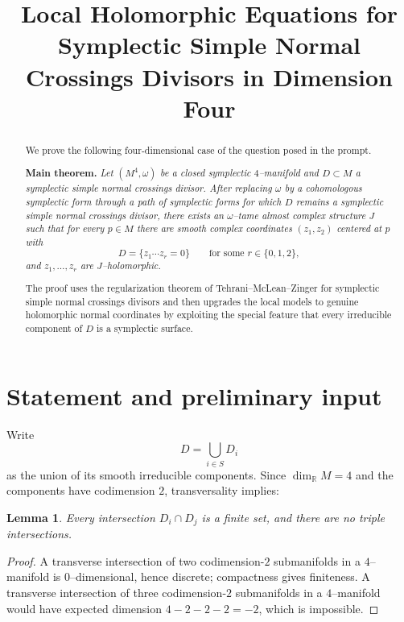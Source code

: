 \documentclass[11pt]{article}
\title{Local Holomorphic Equations for Symplectic Simple Normal Crossings Divisors in Dimension Four}
\author{}
\date{}
\newtheorem{lemma}[theorem]{Lemma}
\theoremstyle{remark}
\newcommand{\RR}{\mathbb{R}}
\begin{document}
\maketitle

\begin{abstract}
We prove the following four-dimensional case of the question posed in the prompt.

\smallskip

\noindent
\textbf{Main theorem.}
\emph{Let $(M^4,\omega)$ be a closed symplectic $4$--manifold and
$D\subset M$ a symplectic simple normal crossings divisor.
After replacing $\omega$ by a cohomologous symplectic form through a path of
symplectic forms for which $D$ remains a symplectic simple normal crossings divisor,
there exists an $\omega$--tame almost complex structure $J$ such that for every
$p\in M$ there are smooth complex coordinates $(z_1,z_2)$ centered at $p$
with
\[
D=\{z_1\cdots z_r=0\}
\qquad\text{for some }r\in\{0,1,2\},
\]
and $z_1,\dots,z_r$ are $J$--holomorphic.}

\smallskip

The proof uses the regularization theorem of Tehrani--McLean--Zinger for
symplectic simple normal crossings divisors and then upgrades the local models
to genuine holomorphic normal coordinates by exploiting the special feature that
every irreducible component of $D$ is a symplectic surface.
\end{abstract}

\section{Statement and preliminary input}

Write
\[
D=\bigcup_{i\in S} D_i
\]
as the union of its smooth irreducible components.
Since $\dim_{\RR}M=4$ and the components have codimension $2$, transversality implies:

\begin{lemma}\label{lem:doublepoints}
Every intersection $D_i\cap D_j$ is a finite set, and there are no triple intersections.
\end{lemma}

\begin{proof}
A transverse intersection of two codimension-$2$ submanifolds in a
$4$--manifold is $0$--dimensional, hence discrete; compactness gives finiteness.
A transverse intersection of three codimension-$2$ submanifolds in a $4$--manifold
would have expected dimension $4-2-2-2=-2$, which is impossible.
\end{proof}
\end{document}
